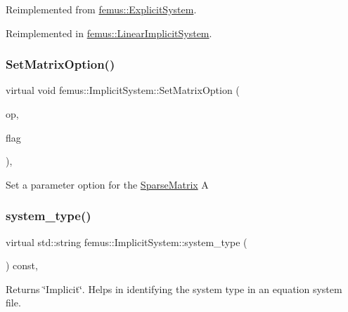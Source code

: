 Reimplemented from \mbox{\hyperlink{classfemus_1_1_explicit_system_a149e74ccad300a58b25f72a6b0439f2b}{femus\+::\+Explicit\+System}}.



Reimplemented in \mbox{\hyperlink{classfemus_1_1_linear_implicit_system_a821e5e01d07a2124ff6f0130f67b5ba6}{femus\+::\+Linear\+Implicit\+System}}.

\mbox{\label{classfemus_1_1_implicit_system_ab87b4c9e86b8262acbdc1f536ead7001}} 
\subsubsection{\texorpdfstring{Set\+Matrix\+Option()}{SetMatrixOption()}}
{\footnotesize\ttfamily virtual void femus\+::\+Implicit\+System\+::\+Set\+Matrix\+Option (\begin{DoxyParamCaption}\item[{Mat\+Option}]{op,  }\item[{bool}]{flag }\end{DoxyParamCaption})\hspace{0.3cm}{\ttfamily [inline]}, {\ttfamily [virtual]}}

Set a parameter option for the \mbox{\hyperlink{classfemus_1_1_sparse_matrix}{Sparse\+Matrix}} A \mbox{\label{classfemus_1_1_implicit_system_aee5e08a09a2d289aa777914018931592}} 
\subsubsection{\texorpdfstring{system\+\_\+type()}{system\_type()}}
{\footnotesize\ttfamily virtual std\+::string femus\+::\+Implicit\+System\+::system\+\_\+type (\begin{DoxyParamCaption}{ }\end{DoxyParamCaption}) const\hspace{0.3cm}{\ttfamily [inline]}, {\ttfamily [virtual]}}

\begin{DoxyReturn}{Returns}
{\ttfamily \char`\"{}\+Implicit\char`\"{}}. Helps in identifying the system type in an equation system file. 
\end{DoxyReturn}


